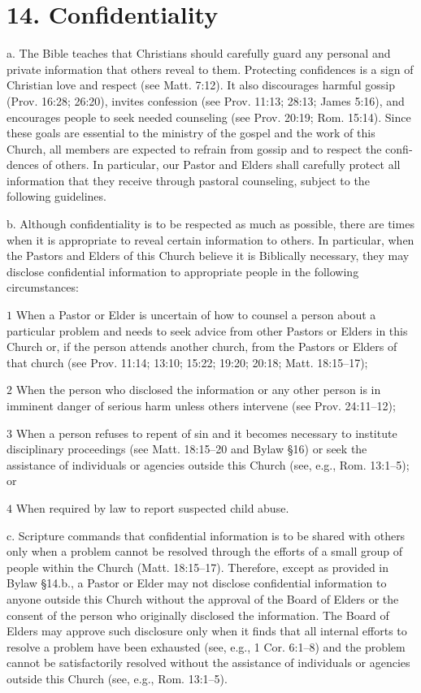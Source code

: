 \documentclass[
]{book}
\begin{document}
\hypertarget{confidentiality}{%
\section{14. Confidentiality}\label{confidentiality}}

a. The Bible teaches that Christians should carefully guard any personal and private information that others reveal to them. Protecting confidences is a sign of Christian love and respect (see Matt. 7:12). It also discourages harmful gossip (Prov. 16:28; 26:20), invites confes­sion (see Prov. 11:13; 28:13; James 5:16), and encourages people to seek needed counseling (see Prov. 20:19; Rom. 15:14). Since these goals are essential to the ministry of the gospel and the work of this Church, all members are expected to refrain from gossip and to respect the confi­dences of others. In particular, our Pastor and Elders shall carefully protect all information that they receive through pastoral counseling, subject to the following guidelines.

b. Although confidentiality is to be respected as much as possible, there are times when it is appropriate to reveal certain information to others. In particular, when the Pastors and Elders of this Church believe it is Biblically necessary, they may disclose confidential information to appropriate people in the following circumstances:

\(1\) When a Pastor or Elder is uncertain of how to counsel a person about a particular problem and needs to seek advice from other Pastors or Elders in this Church or, if the person attends another church, from the Pastors or Elders of that church (see Prov. 11:14; 13:10; 15:22; 19:20; 20:18; Matt. 18:15--17);

\(2\) When the person who disclosed the information or any other person is in imminent danger of serious harm unless others intervene (see Prov. 24:11--12);

\(3\) When a person refuses to repent of sin and it becomes necessary to institute disciplinary proceedings (see Matt. 18:15--20 and Bylaw §16) or seek the assistance of individuals or agencies outside this Church (see, e.g., Rom. 13:1--5); or

\(4\) When required by law to report suspected child abuse.

c. Scripture commands that confidential information is to be shared with others only when a problem cannot be resolved through the efforts of a small group of people within the Church (Matt. 18:15--17). Therefore, except as provided in Bylaw §14.b., a Pastor or Elder may not disclose confidential information to anyone outside this Church without the approval of the Board of Elders or the consent of the person who originally disclosed the information. The Board of Elders may approve such disclosure only when it finds that all internal efforts to resolve a problem have been exhausted (see, e.g., 1 Cor. 6:1--8) and the problem cannot be satisfactorily resolved without the assistance of individuals or agencies outside this Church (see, e.g., Rom. 13:1--5).
\end{document}
